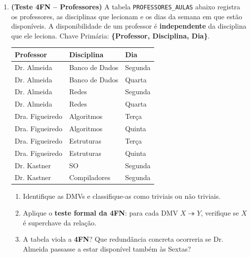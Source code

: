 \documentclass[12pt]{article}
\begin{document}
\begin{enumerate}[label=\textbf{Questão \arabic*:}, leftmargin=*]
  \vspace{0.4cm}

  \item \textbf{(Teste 4FN -- Professores)} A tabela \texttt{PROFESSORES\_AULAS} abaixo registra os professores, as disciplinas que lecionam e os dias da semana em que estão disponíveis. A disponibilidade de um professor é \textbf{independente} da disciplina que ele leciona. Chave Primária: \textbf{\{Professor, Disciplina, Dia\}}.

  \vspace{0.2cm}
  \centering
  \begin{tabular}{|l|l|l|}
    \hline
    \textbf{Professor} & \textbf{Disciplina} & \textbf{Dia} \\ \hline
    Dr. Almeida  & Banco de Dados & Segunda  \\ \hline
    Dr. Almeida  & Banco de Dados & Quarta   \\ \hline
    Dr. Almeida  & Redes          & Segunda  \\ \hline
    Dr. Almeida  & Redes          & Quarta   \\ \hline
    Dra. Figueiredo & Algoritmos  & Terça    \\ \hline
    Dra. Figueiredo & Algoritmos  & Quinta   \\ \hline
    Dra. Figueiredo & Estruturas  & Terça    \\ \hline
    Dra. Figueiredo & Estruturas  & Quinta   \\ \hline
    Dr. Kastner  & SO             & Segunda  \\ \hline
    Dr. Kastner  & Compiladores   & Segunda  \\ \hline
  \end{tabular}
  \flushleft
  \vspace{0.2cm}
  \begin{enumerate}[label=\alph*)]
    \item Identifique as DMVs e classifique-as como triviais ou não triviais.
    \item Aplique o \textbf{teste formal da 4FN}: para cada DMV $X \twoheadrightarrow Y$, verifique se $X$ é superchave da relação.
    \item A tabela viola a \textbf{4FN}? Que redundância concreta ocorreria se Dr. Almeida passasse a estar disponível também às Sextas?
  \end{enumerate}



\end{enumerate}
\end{document}
